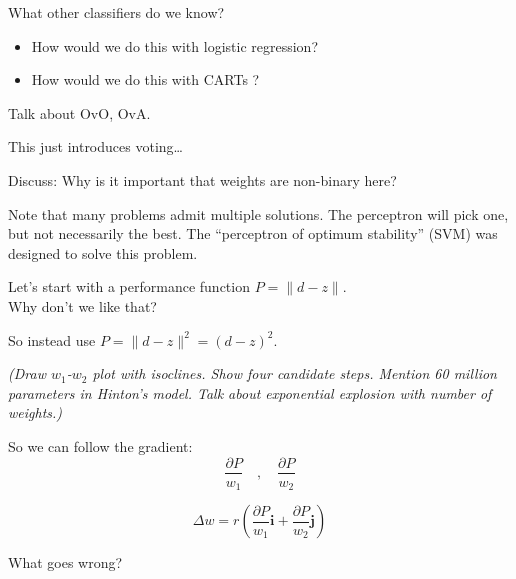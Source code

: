 

What other classifiers do we know?
\begin{itemize}
\item How would we do this with logistic regression?
\item How would we do this with CARTs ?
\end{itemize}

Talk about OvO, OvA.

This just introduces voting\dots

Discuss: Why is it important that weights are non-binary here?

Note that many problems admit multiple solutions.  The perceptron will
pick one, but not necessarily the best.  The ``perceptron of optimum
stability'' (SVM) was designed to solve this problem.



Let's start with a performance function $P=\| d-z \|$.  \\
Why don't we like that?

So instead use $P=\| d-z \|^2 = (d-z)^2$.

\textit{(Draw $w_1$-$w_2$ plot with isoclines.  Show four candidate
  steps.  Mention 60 million parameters in Hinton's model.  Talk about
  exponential explosion with number of weights.)}

So we can follow the gradient:
\begin{displaymath}
  \frac{\partial P}{w_1} \quad , \quad   \frac{\partial P}{w_2}
\end{displaymath}

\begin{displaymath}
  \Delta w = r\left( \frac{\partial P}{w_1} \mathbf{i} +
    \frac{\partial P}{w_2} \mathbf{j} \right)
\end{displaymath}

What goes wrong?\\

